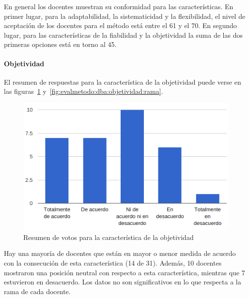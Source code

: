 En general los docentes muestran su conformidad para las características. En primer lugar, para la adaptabilidad, la sistematicidad y la flexibilidad, el nivel de aceptación de los docentes para el método está entre el 61 y el 70\percentage. En segundo lugar, para las características de la fiabilidad y la objetividad la suma de las dos primeras opciones está en torno al 45\percentage.

\newpage
\paragraph*{Objetividad}

El resumen de respuestas para la característica de la objetividad puede verse en las figuras~\ref{fig:evalmetodo:dba:objetividad} y~\ref{fig:evalmetodo:dba:objetividad:rama}.

\begin{figure}[h]
  \begin{center}
    \includegraphics[scale=0.5]{C_DBA_objetividad.png}
  \end{center}
  \caption{Resumen de votos para la característica de la objetividad}
  \label{fig:evalmetodo:dba:objetividad}
\end{figure}

Hay una mayoría de docentes que están en mayor o menor medida de acuerdo con la consecución de esta característica (14 de 31). Además, 10 docentes mostraron una posición neutral con respecto a esta característica, mientras que 7 estuvieron en desacuerdo. Los datos no son significativos en lo que respecta a la rama de cada docente.

